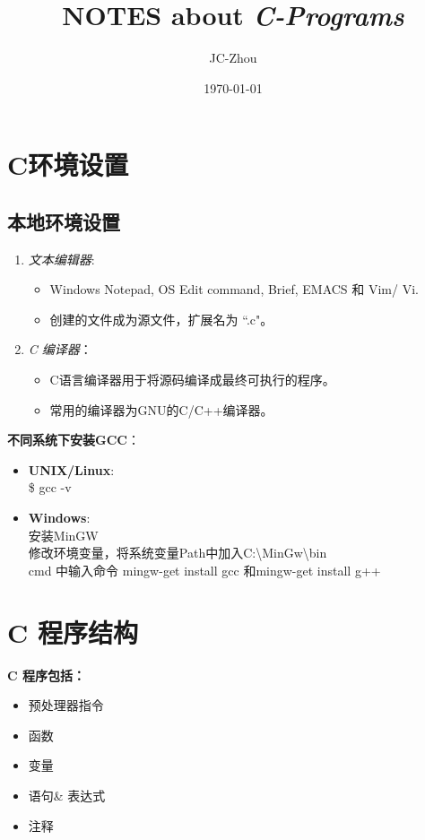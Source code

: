 \documentclass[UTF8]{ctexart}
\author{JC-Zhou}
\title{NOTES about \textit{C-Programs}}
\date{\today}
\begin{document}
	\maketitle
	
	\section{C环境设置}
	\subsection{本地环境设置}
	\begin{enumerate}
		\item \emph{文本编辑器}: \begin{itemize}
			\item Windows Notepad, OS Edit command, Brief, EMACS 和 Vim/ Vi.
			\item 创建的文件成为源文件，扩展名为 ``.c"。
		\end{itemize}
		\item \emph{C 编译器}：\begin{itemize}
			\item C语言编译器用于将源码编译成最终可执行的程序。
			\item 常用的编译器为GNU的C/C++编译器。
		\end{itemize}
	\end{enumerate}
	\begin{framed}
	\textbf{不同系统下安装GCC}：
		\begin{itemize}
			\item \textbf{UNIX/Linux}:\\
			\$ gcc -v
			\item \textbf{Windows}:\\安装MinGW\\修改环境变量，将系统变量Path中加入C:\textbackslash MinGw\textbackslash bin \\cmd 中输入命令 mingw-get install gcc 和mingw-get install g++
		\end{itemize}
	\end{framed}

	\clearpage
	\section{C 程序结构}
	\textbf{C 程序包括：}
	\begin{itemize}
		\item 预处理器指令
		\item 函数
		\item 变量
		\item 语句\& 表达式
		\item 注释
	\end{itemize}
	
\end{document}
